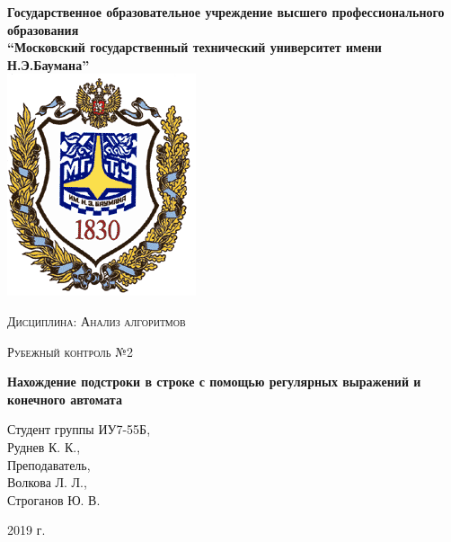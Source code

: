 \documentclass[a4paper,12pt]{report}
\begin{document}
    \begin{titlepage}

        \begin{center}
            \large
            \textbf{Государственное образовательное учреждение высшего профессионального образования\\
            “Московский государственный технический университет имени Н.Э.Баумана”\\}
            \includegraphics{bmstu-logo.png}
			\vspace{1cm}
            
            \textsc{Дисциплина: Анализ алгоритмов}
            \vspace{0.5cm}
                
            \textsc{Рубежный контроль №2}
            \vspace{1cm}
            
            {\LARGE \textbf{Нахождение подстроки в строке с помощью регулярных выражений и конечного автомата}}
            \vspace{3cm}
                    
            \begin{flushright}
            	Студент группы ИУ7-55Б,\\   
            	Руднев К. К.,\\
            	\vspace{0.5cm}
            	Преподаватель,\\
            	Волкова Л. Л.,\\
            	Строганов Ю. В.
            	
            \end{flushright}
            \vfill
            
            2019 г.
            
        \end{center}

    \end{titlepage}
\end{document}
